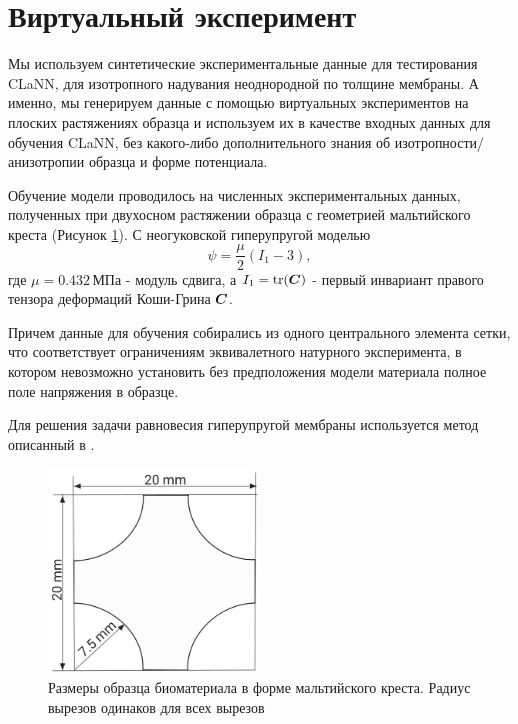 \section{Виртуальный эксперимент}

Мы используем синтетические экспериментальные данные для тестирования CLaNN, для изотропного надувания неоднородной по толщине мембраны. 
А именно, мы генерируем данные с помощью виртуальных экспериментов на плоских растяжениях образца и используем их в качестве входных данных для 
обучения CLaNN, без какого-либо дополнительного знания об изотропности/анизотропии образца и форме потенциала.
 
Обучение модели проводилось на численных экспериментальных данных, 
полученных при двухосном растяжении образца с геометрией мальтийского креста (Рисунок \ref{fig:malt_geometry}).
С неогуковской гиперупругой моделью \cite{ogden1997nonlinear}
\begin{equation}
 \psi = \frac{\mu}{2}(I_1 - 3),
\label{eq:neo_hookean_energy}
\end{equation}
где $\mu = 0.432 \,\text{МПа}$ - модуль сдвига, а $I_1 = \text{tr}(\boldsymbol{C})$ - первый инвариант правого тензора деформаций Коши-Грина $\boldsymbol{C}$.

Причем данные для обучения собирались из одного центрального элемента сетки, что соответствует ограничениям эквивалетного 
натурного эксперимента, в котором невозможно установить без предположения модели материала полное поле напряжения в образце.

Для решения задачи равновесия гиперупругой мембраны используется метод описанный в \cite{ddaniso2024}.

\begin{figure}[H]
  \centering
  \includegraphics[width=0.5\textwidth]{img/malt_geom.png}
  \caption{Размеры образца биоматериала в форме мальтийского креста. 
  Радиус вырезов одинаков для всех вырезов}
  \label{fig:malt_geometry}
\end{figure}

